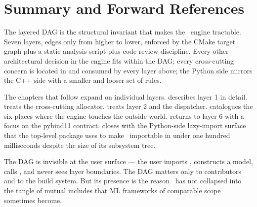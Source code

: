 \section{Summary and Forward References}
\label{sec:layered_dag:summary}

The layered DAG is the structural invariant that makes the \Lucid\
engine tractable. Seven layers, edges only from higher to lower,
enforced by the CMake target graph plus a static analysis script
plus code-review discipline. Every other architectural decision in
the engine fits within the DAG; every cross-cutting concern is
located in  and consumed by every layer above; the
Python side mirrors the C++ side with a smaller and looser set of
rules.

The chapters that follow expand on individual layers.
 describes layer 1 in detail.
 treats the cross-cutting allocator.
 treats layer 2 and the dispatcher.
 catalogues the six places where the
engine touches the outside world.
 returns to layer 6 with a focus on
the pybind11 contract. \chref{ch:lazy_imports} closes
 with the Python-side lazy-import surface
that the top-level package uses to make \Lucid\ importable in
under one hundred milliseconds despite the size of its subsystem
tree.

\begin{lucidnote}
The DAG is invisible at the user surface --- the user imports
, constructs a model, calls , and never
sees layer boundaries. The DAG matters only to contributors and to
the build system. But its presence is the reason \Lucid\ has not
collapsed into the tangle of mutual includes that ML frameworks of
comparable scope sometimes become.
\end{lucidnote}
